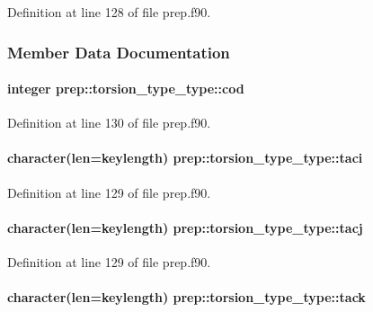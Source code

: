 Definition at line 128 of file prep.\-f90.



\subsubsection{Member Data Documentation}
\hypertarget{structprep_1_1torsion__type__type_a75a1521b777c2d3d0dcab07dbd79f9a7}{
\paragraph[{cod}]{\setlength{\rightskip}{0pt plus 5cm}integer prep\-::torsion\-\_\-type\-\_\-type\-::cod}}\label{structprep_1_1torsion__type__type_a75a1521b777c2d3d0dcab07dbd79f9a7}


Definition at line 130 of file prep.\-f90.

\hypertarget{structprep_1_1torsion__type__type_abf17ef2a5210195adb48303837d01da8}{
\paragraph[{taci}]{\setlength{\rightskip}{0pt plus 5cm}character(len=keylength) prep\-::torsion\-\_\-type\-\_\-type\-::taci}}\label{structprep_1_1torsion__type__type_abf17ef2a5210195adb48303837d01da8}


Definition at line 129 of file prep.\-f90.

\hypertarget{structprep_1_1torsion__type__type_a991856b59c2a06950f8905cb4fe28d6a}{
\paragraph[{tacj}]{\setlength{\rightskip}{0pt plus 5cm}character(len=keylength) prep\-::torsion\-\_\-type\-\_\-type\-::tacj}}\label{structprep_1_1torsion__type__type_a991856b59c2a06950f8905cb4fe28d6a}


Definition at line 129 of file prep.\-f90.

\hypertarget{structprep_1_1torsion__type__type_ac1ca3f8ddcb778ca50d16147528cd72d}{
\paragraph[{tack}]{\setlength{\rightskip}{0pt plus 5cm}character(len=keylength) prep\-::torsion\-\_\-type\-\_\-type\-::tack}}\label{structprep_1_1torsion__type__type_ac1ca3f8ddcb778ca50d16147528cd72d}


